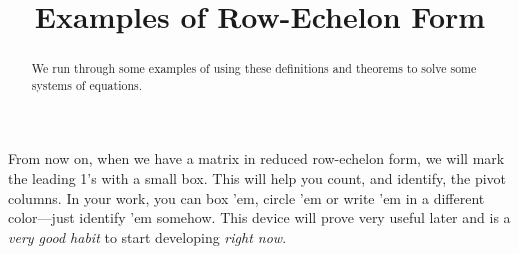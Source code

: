 \documentclass{ximera}
\title{Examples of Row-Echelon Form}
\begin{document}
\begin{abstract}
  We run through some examples of using these definitions and theorems
  to solve some systems of equations.
\end{abstract}
\maketitle

From now on, when we have a matrix in reduced row-echelon form, we
will mark the leading 1's with a small box.  This will help you count,
and identify, the pivot columns.  In your work, you can box 'em,
circle 'em or write 'em in a different color---just identify 'em
somehow.  This device will prove very useful later and is a
\textit{very good habit} to start developing \textit{right now}.
\end{document}
